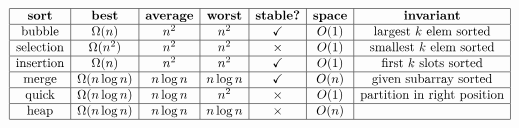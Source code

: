 \documentclass[10pt, landscape]{article}
\makeatletter
\renewcommand{\section}{\@startsection{section}{1}{0mm}%
                                {-1ex plus -.5ex minus -.2ex}%
                                {0.5ex plus .2ex}%
                                {\normalfont\large\bfseries}}
\makeatother
\begin{document}
\begin{minipage}{0.4\linewidth} 
    $\begin{array}{| c | c | c | c | c | c | c |}
        \hline\textbf{sort} & \textbf{best} & \textbf{average} & \textbf{worst} & \textbf{stable?} & \textbf{space} & \textbf{invariant}
        \\\hline\text{bubble} & \Omega(n) & n^2 & n^2 & \checkmark & O(1) & \text{largest } k \text{ elem sorted}
        \\\hline\text{selection} & \Omega(n^2) & n^2 & n^2 & \times & O(1) & \text{smallest } k \text{ elem sorted}
        \\\hline\text{insertion} & \Omega(n) & n^2 & n^2 & \checkmark & O(1) & \text{first } k \text{ slots sorted}
        \\\hline\text{merge} & \Omega(n\log n) & n\log n & n\log n & \checkmark & O(n) & \text{given subarray sorted}
        \\\hline\text{quick} & \Omega(n\log n) & n\log n & n^2 & \times & O(1) & \text{partition in right position}
        \\\hline\text{heap} & \Omega(n\log n) & n\log n & n\log n & \times & O(n) & 
        \\\hline
    \end{array} 
    $\
\end{minipage}%
\end{document}
